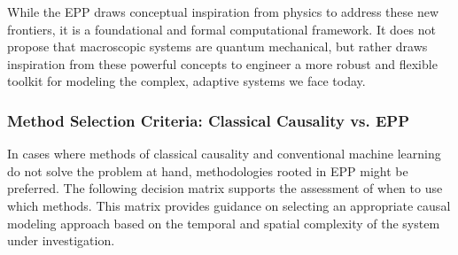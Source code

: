 While the EPP draws conceptual inspiration from physics to address these new frontiers, it is a foundational and formal computational
framework. It does not propose that macroscopic systems are quantum mechanical, but rather draws inspiration from these powerful
concepts to engineer a more robust and flexible toolkit for modeling the complex, adaptive systems we face today.

\newpage

\subsubsection{Method Selection Criteria: Classical Causality vs. EPP}

In cases where methods of classical causality and conventional machine learning do not solve the problem at hand, methodologies rooted in EPP might be preferred. The following decision matrix supports the assessment of when to use which methods. This matrix provides guidance on selecting an appropriate causal modeling approach based on the temporal and spatial complexity of the system under investigation.

